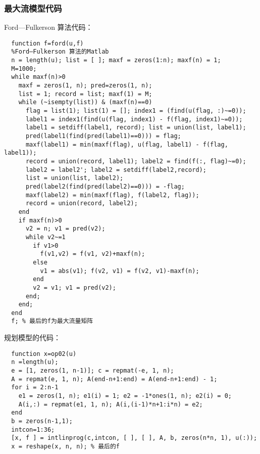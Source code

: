 \subsubsection{最大流模型代码}
\noindent Ford—Fulkerson 算法代码：
\begin{lstlisting}
  function f=ford(u,f)
  %Ford—Fulkerson 算法的Matlab
  n = length(u); list = [ ]; maxf = zeros(1:n); maxf(n) = 1;
  M=1000;
  while maxf(n)>0
    maxf = zeros(1, n); pred=zeros(1, n);
    list = 1; record = list; maxf(1) = M;
    while (~isempty(list)) & (maxf(n)==0)
      flag = list(1); list(1) = []; index1 = (find(u(flag, :)~=0));
      label1 = index1(find(u(flag, index1) - f(flag, index1)~=0));
      label1 = setdiff(label1, record); list = union(list, label1);
      pred(label1(find(pred(label1)==0))) = flag;
      maxf(label1) = min(maxf(flag), u(flag, label1) - f(flag, label1));
      record = union(record, label1); label2 = find(f(:, flag)~=0);
      label2 = label2'; label2 = setdiff(label2,record);
      list = union(list, label2);
      pred(label2(find(pred(label2)==0))) = -flag;
      maxf(label2) = min(maxf(flag), f(label2, flag));
      record = union(record, label2);
    end
    if maxf(n)>0
      v2 = n; v1 = pred(v2);
      while v2~=1
        if v1>0
          f(v1,v2) = f(v1, v2)+maxf(n);
        else
          v1 = abs(v1); f(v2, v1) = f(v2, v1)-maxf(n);
        end
        v2 = v1; v1 = pred(v2);
      end; 
    end; 
  end
  f; % 最后的f为最大流量矩阵
\end{lstlisting}
规划模型的代码：
\begin{lstlisting}
  function x=op02(u)
  n =length(u);
  e = [1, zeros(1, n-1)]; c = repmat(-e, 1, n);
  A = repmat(e, 1, n); A(end-n+1:end) = A(end-n+1:end) - 1;
  for i = 2:n-1
    e1 = zeros(1, n); e1(i) = 1; e2 = -1*ones(1, n); e2(i) = 0;
    A(i,:) = repmat(e1, 1, n); A(i,(i-1)*n+1:i*n) = e2; 
  end
  b = zeros(n-1,1);
  intcon=1:36;
  [x, f ] = intlinprog(c,intcon, [ ], [ ], A, b, zeros(n*n, 1), u(:));
  x = reshape(x, n, n); % 最后的f
\end{lstlisting}
